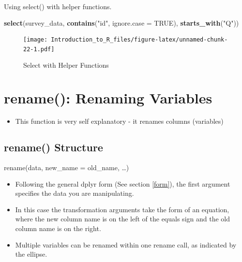 \documentclass[]{book}
\newenvironment{Shaded}{\begin{snugshade}}{\end{snugshade}}
\newcommand{\DataTypeTok}[1]{\textcolor[rgb]{0.13,0.29,0.53}{#1}}
\newcommand{\KeywordTok}[1]{\textcolor[rgb]{0.13,0.29,0.53}{\textbf{#1}}}
\newcommand{\NormalTok}[1]{#1}
\newcommand{\OtherTok}[1]{\textcolor[rgb]{0.56,0.35,0.01}{#1}}
\newcommand{\StringTok}[1]{\textcolor[rgb]{0.31,0.60,0.02}{#1}}
\providecommand{\tightlist}{%
  \setlength{\itemsep}{0pt}\setlength{\parskip}{0pt}}
\theoremstyle{definition}
\theoremstyle{definition}
\theoremstyle{definition}
\theoremstyle{remark}
\let\BeginKnitrBlock\begin \let\EndKnitrBlock\end
\begin{document}
\BeginKnitrBlock{example}
\protect\hypertarget{exm:select4}{}{\label{exm:select4} }Using select() with helper functions.
\EndKnitrBlock{example}

\begin{Shaded}
\begin{Highlighting}[]
\KeywordTok{select}\NormalTok{(survey_data, }\KeywordTok{contains}\NormalTok{(}\StringTok{"id"}\NormalTok{, }\DataTypeTok{ignore.case =} \OtherTok{TRUE}\NormalTok{), }\KeywordTok{starts_with}\NormalTok{(}\StringTok{"Q"}\NormalTok{))}
\end{Highlighting}
\end{Shaded}

\begin{figure}
\centering
\texttt{[image: Introduction\_to\_R\_files/figure-latex/unnamed-chunk-22-1.pdf]}
\caption{\label{fig:unnamed-chunk-22}Select with Helper Functions}
\end{figure}

\hypertarget{rename-renaming-variables}{%
\section{rename(): Renaming Variables}\label{rename-renaming-variables}}

\begin{itemize}
\tightlist
\item
  This function is very self explanatory - it renames columns (variables)
\end{itemize}

\hypertarget{rename-structure}{%
\subsection{rename() Structure}\label{rename-structure}}

rename(data, new\_name = old\_name, \ldots{})

\begin{itemize}
\tightlist
\item
  Following the general dplyr form (See section \ref{form}), the first argument specifies the data you are manipulating.
\item
  In this case the transformation arguments take the form of an equation, where the new column name is on the left of the equals sign and the old column name is on the right.
\item
  Multiple variables can be renamed within one rename call, as indicated by the ellipse.
\end{itemize}
\end{document}
